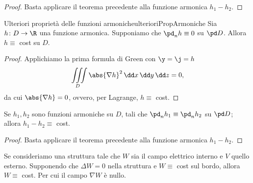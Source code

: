 \begin{proof}
	Basta applicare il teorema precedente alla funzione armonica \(h_1-h_2\).
\end{proof}

\begin{teor}{Ulteriori proprietà delle funzioni armoniche}{ulterioriPropArmoniche}
	Sia \(h\colon D \to \R\) una funzione armonica.
	Supponiamo che \(\pd_n h \equiv 0\) su \(\pd D\).
	Allora \(h \equiv \) cost su \(D\).
\end{teor}

\begin{proof}
	Applichiamo la prima formula di Green con \(\y=\j=h\)
	\[
		\iiint\limits_D \abs{\nabla h}^2\,\dd x\,\dd y\,\dd z = 0,
	\]
	da cui \(\abs{\nabla h} = 0\), ovvero, per Lagrange, \(h\equiv \) cost.
\end{proof}

\begin{cor}
	Se \(h_1,h_2\) sono funzioni armoniche su \(D\), tali che \(\pd_n h_1 \equiv \pd_n h_2\) su \(\pd D\);
	allora \(h_1-h_2 \equiv \) cost.
\end{cor}

\begin{proof}
	Basta applicare il teorema precedente alla funzione armonica \(h_1-h_2\).
\end{proof}

\begin{ese}
	Se consideriamo una struttura tale che \(W\) sia il campo elettrico interno e \(V\) quello esterno.
	Supponendo che \(\Delta W = 0\) nella struttura e \(W\equiv \) cost sul bordo, allora \(W\equiv \) cost.
	Per cui il campo \(\nabla W\) è nullo.
\end{ese}